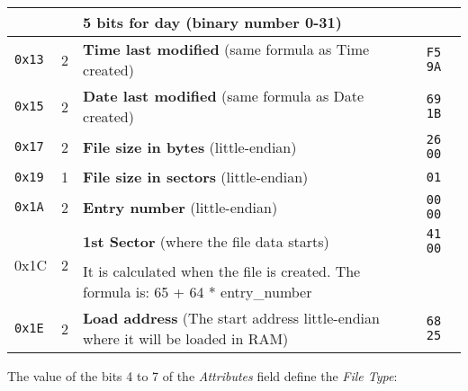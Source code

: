 \begin{longtable}{ |m{1cm}|m{1.3cm}|m{6.8cm}|m{2.7cm}| }
            & & 5 bits for day (binary number 0-31) &\\
            \hline
            \texttt{0x13} & 2 & \textbf{Time last modified} (same formula as
            Time created) & \texttt{F5 9A}\\
            \hline
            \texttt{0x15} & 2 & \textbf{Date last modified} (same formula as
            Date created) & \texttt{69 1B}\\
            \hline
            \texttt{0x17} & 2 & \textbf{File size in bytes} (little-endian) &
            \texttt{26 00}\\
            \hline
            \texttt{0x19} & 1 & \textbf{File size in sectors} (little-endian) &
            \texttt{01}\\
            \hline
            \texttt{0x1A} & 2 & \textbf{Entry number} (little-endian) &
            \texttt{00 00}\\
            \hline
            \multirow{2}{4em}{0x1C} & \multirow{2}{4em}{2} & \textbf{1st Sector}
            (where the file data starts) & \texttt{41 00}\\
            & & It is calculated when the file is created. The formula is: 65 + 
            64 * entry\_number &\\
            \hline
            \texttt{0x1E} & 2 & \textbf{Load address} (The start address
            little-endian where it will be loaded in RAM) & \texttt{68 25}\\
            \hline
        \end{longtable}

        The value of the bits 4 to 7 of the \textit{Attributes} field define the
        \textit{File Type}:

